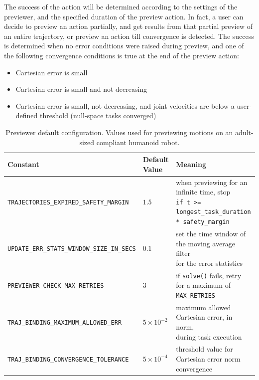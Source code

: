 The success of the action will be determined according to the settings of the previewer, and the specified duration of the preview action. In fact, a user can decide to preview an action partially, and get results from that partial preview of an entire trajectory, or preview an action till convergence is detected. The success is determined when no error conditions were raised during preview, and one of the following convergence conditions is true at the end of the preview action:
\begin{itemize}
\item Cartesian error is small
\item Cartesian error is small and not decreasing
\item Cartesian error is small, not decreasing, and joint velocities are below a user-defined threshold (null-space tasks converged) 
\end{itemize}

\begin{table}[hbt]
   \small
   \begin{center}
   \begin{tabular}{| >{\centering\arraybackslash}m{2.3in} | >{\centering\arraybackslash}m{0.5in} | >{\centering\arraybackslash}m{3in} |}
   \hline
   \textbf{Constant} & \textbf{Default Value} & \textbf{Meaning} \\\hline
   \cline{1-3}
   \footnotesize{\texttt{TRAJECTORIES\_EXPIRED\_SAFETY\_MARGIN}}           & $1.5$   & \shortstack{when previewing for an infinite time, stop \\ \footnotesize{\texttt{if t >= longest\_task\_duration * safety\_margin}}} \\\hline
   \footnotesize{\texttt{UPDATE\_ERR\_STATS\_WINDOW\_SIZE\_IN\_SECS}} & $0.1$    & \shortstack{set the time window of the moving average filter \\ for the error statistics} \\\hline
   \footnotesize{\texttt{PREVIEWER\_CHECK\_MAX\_RETRIES}}                  & $3$     & if \texttt{solve()} fails, retry for a maximum of \footnotesize{\texttt{MAX\_RETRIES}} \\\hline
   \footnotesize{\texttt{TRAJ\_BINDING\_MAXIMUM\_ALLOWED\_ERR}}           & $5\times10^{-2}$  & \shortstack{maximum allowed Cartesian error, in norm, \\ during task execution} \\\hline
   \footnotesize{\texttt{TRAJ\_BINDING\_CONVERGENCE\_TOLERANCE}}           & $5\times10^{-4}$  & threshold value for Cartesian error norm convergence \\\hline
   \end{tabular}
   \end{center}
   \caption{Previewer default configuration. Values used for previewing motions on an adult-sized compliant humanoid robot.}
   \label{table:previewer_constants}
\end{table}

